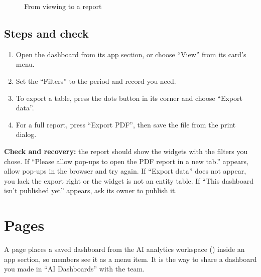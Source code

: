 \begin{figure}[H]
\centering
{}
\rclegend
\caption{From viewing to a report}
\label{fig:builder-dashboards-viewing-flow}
\end{figure}

\subsection{Steps and check}
\begin{enumerate}
\item Open the dashboard from its app section, or choose “View” from its card's menu.
\item Set the “Filters” to the period and record you need.
\item To export a table, press the dots button in its corner and choose “Export data”.
\item For a full report, press “Export PDF”, then save the file from the print dialog.
\end{enumerate}

\textbf{Check and recovery:} the report should show the widgets with the filters you chose. If “Please allow pop-ups to open the PDF report in a new tab.” appears, allow pop-ups in the browser and try again. If “Export data” does not appear, you lack the export right or the widget is not an entity table. If “This dashboard isn't published yet” appears, ask its owner to publish it.

\clearpage
\section{Pages}
\label{sec:builder-feature-pages}

A page places a saved dashboard from the AI analytics workspace () inside an app section, so members see it as a menu item. It is the way to share a dashboard you made in “AI Dashboards” with the team.

